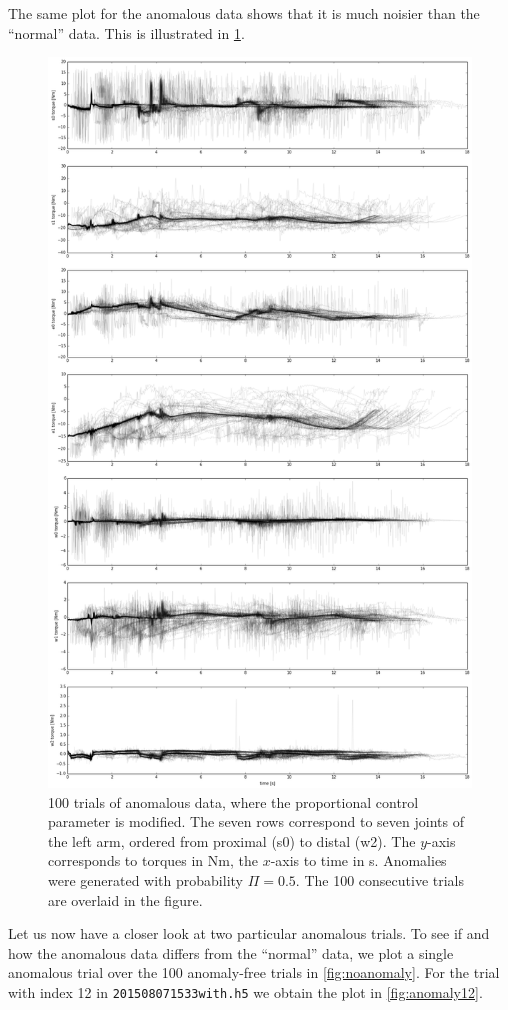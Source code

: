 \documentclass{scrartcl}
\begin{document}
    The same plot for the anomalous data shows that it is much noisier than the ``normal'' data.
    This is illustrated in \cref{fig:controlbroke}.
    \begin{figure}
        \centering
        \includegraphics[width=.7\textwidth]{figs/controller_broke3.png}
        \caption{100 trials of anomalous data, where the proportional control parameter is modified.
            The seven rows correspond to seven joints of the left arm, ordered from proximal (s0) to distal (w2).
            The $y$-axis corresponds to torques in Nm, the $x$-axis to time in s.
            Anomalies were generated with probability $\Pi = 0.5$.
            The 100 consecutive trials are overlaid in the figure.}
        \label{fig:controlbroke}
    \end{figure}
    Let us now have a closer look at two particular anomalous trials.
    To see if and how the anomalous data differs from the ``normal'' data, we plot a single anomalous trial over the 100 anomaly-free trials in \cref{fig:noanomaly}.
    For the trial with index 12 in \texttt{201508071533with.h5} we obtain the plot in \cref{fig:anomaly12}.
\end{document}
